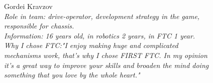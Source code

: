 \begin{figure}[H]
	\begin{minipage}{0.47\linewidth}
		Gordei Kravzov\\
		\emph{Role in team: drive-operator, development strategy in the game, responsible for chassis.\\ }
		\emph{Information: 16 years old, in robotics 2 years, in FTC 1 year. \\ } 
		\emph{Why I chose FTC:"I enjoy making huge and complicated mechanisms work, that's why I chose FIRST FTC. In my opinion it's a great way to improve your skills and broaden the mind doing something that you love by the whole heart."}		
	\end{minipage}
	\hfill
	\begin{minipage}[h]{0.47\linewidth}
		\\
	\end{minipage}
\end{figure}

\fillpage



